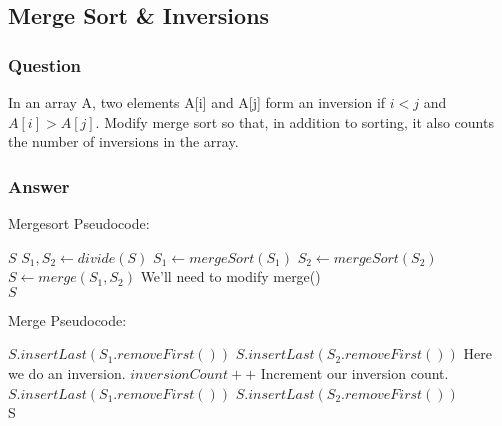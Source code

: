 \documentclass[12pt]{article}
\begin{document}
\subsection{Merge Sort \& Inversions}
\subsubsection{Question}
In an array A, two elements A[i] and A[j] form an inversion if $ i < j $ and $ A[i] > A[j] $. Modify merge sort so that, in addition to sorting, it also counts the number of inversions in the array.
\subsubsection{Answer}
Mergesort Pseudocode:
\begin{algorithmic}
		\Return $ S $
	\EndIf
	\State $ S_1, S_2 \gets divide(S) $
	\State $ S_1 \gets mergeSort(S_1) $
	\State $ S_2 \gets mergeSort(S_2) $
	\State $ S \gets merge(S_1, S_2) $ 
	\Comment We'll need to modify merge()
	\\
	\Return $ S $
\end{algorithmic}
Merge Pseudocode:
\begin{algorithmic}
			\State $ S.insertLast(S_1.removeFirst()) $
		\Else
			\State $ S.insertLast(S_2.removeFirst()) $
			\Comment Here we do an inversion.
			\State $ inversionCount++ $
			\Comment Increment our inversion count.
		\EndIf
	\EndWhile
		\State $ S.insertLast(S_1.removeFirst()) $
	\EndWhile
		\State $ S.insertLast(S_2.removeFirst()) $
	\EndWhile
	\\
	\Return S
\end{algorithmic}
\end{document}

